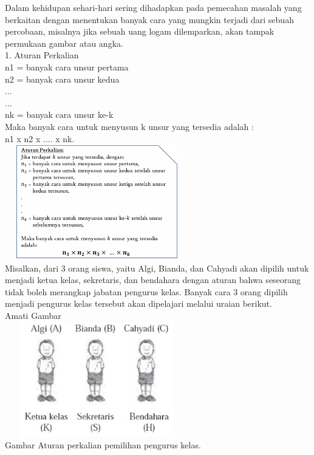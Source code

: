 \documentclass[11pt,fleqn]{book} %
\begin{document}
	Dalam kehidupan sehari-hari sering dihadapkan pada pemecahan masalah yang berkaitan dengan menentukan banyak cara yang mungkin terjadi dari sebuah percobaan, misalnya jika sebuah uang logam dilemparkan, akan tampak permukaan gambar atau angka.\\ 



1. Aturan Perkalian\\

n1 = banyak cara unsur pertama\\

n2 = banyak cara unsur kedua\\

...\\

...\\

nk = banyak cara unsur ke-k\\

Maka banyak cara untuk menyusun k unsur yang tersedia adalah :\\

n1 x n2 x .... x nk.\\



\includegraphics[width = 8cm, height= 5cm]{Pictures/materikaidah1.png}\\

 Misalkan, dari 3 orang siswa, yaitu Algi, Bianda, dan Cahyadi akan dipilih untuk menjadi ketua kelas, sekretaris, dan bendahara dengan aturan bahwa seseorang tidak boleh merangkap jabatan pengurus kelas. Banyak cara 3 orang dipilih menjadi pengurus kelas tersebut akan dipelajari melalui uraian berikut.\\
  Amati Gambar\\
 
 \includegraphics[width = 8cm, height= 5cm]{Pictures/gen1.png}\\
Gambar  Aturan perkalian pemilihan pengurus kelas.\\
\end{document}
